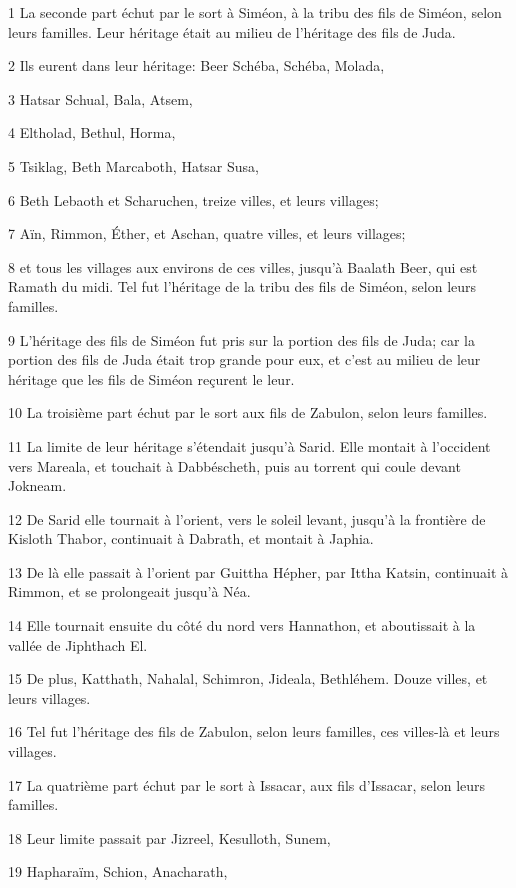 \par 1 La seconde part échut par le sort à Siméon, à la tribu des fils de Siméon, selon leurs familles. Leur héritage était au milieu de l'héritage des fils de Juda.
\par 2 Ils eurent dans leur héritage: Beer Schéba, Schéba, Molada,
\par 3 Hatsar Schual, Bala, Atsem,
\par 4 Eltholad, Bethul, Horma,
\par 5 Tsiklag, Beth Marcaboth, Hatsar Susa,
\par 6 Beth Lebaoth et Scharuchen, treize villes, et leurs villages;
\par 7 Aïn, Rimmon, Éther, et Aschan, quatre villes, et leurs villages;
\par 8 et tous les villages aux environs de ces villes, jusqu'à Baalath Beer, qui est Ramath du midi. Tel fut l'héritage de la tribu des fils de Siméon, selon leurs familles.
\par 9 L'héritage des fils de Siméon fut pris sur la portion des fils de Juda; car la portion des fils de Juda était trop grande pour eux, et c'est au milieu de leur héritage que les fils de Siméon reçurent le leur.
\par 10 La troisième part échut par le sort aux fils de Zabulon, selon leurs familles.
\par 11 La limite de leur héritage s'étendait jusqu'à Sarid. Elle montait à l'occident vers Mareala, et touchait à Dabbéscheth, puis au torrent qui coule devant Jokneam.
\par 12 De Sarid elle tournait à l'orient, vers le soleil levant, jusqu'à la frontière de Kisloth Thabor, continuait à Dabrath, et montait à Japhia.
\par 13 De là elle passait à l'orient par Guittha Hépher, par Ittha Katsin, continuait à Rimmon, et se prolongeait jusqu'à Néa.
\par 14 Elle tournait ensuite du côté du nord vers Hannathon, et aboutissait à la vallée de Jiphthach El.
\par 15 De plus, Katthath, Nahalal, Schimron, Jideala, Bethléhem. Douze villes, et leurs villages.
\par 16 Tel fut l'héritage des fils de Zabulon, selon leurs familles, ces villes-là et leurs villages.
\par 17 La quatrième part échut par le sort à Issacar, aux fils d'Issacar, selon leurs familles.
\par 18 Leur limite passait par Jizreel, Kesulloth, Sunem,
\par 19 Hapharaïm, Schion, Anacharath,
